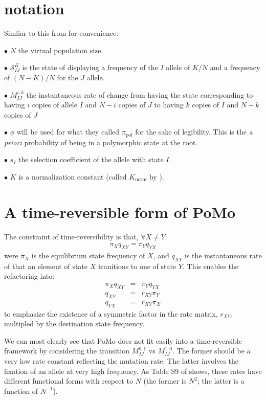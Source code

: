 \documentclass{llncs}
\newcommand{\virtPopSize}{\ensuremath{N}}
\newcommand{\polyProb}{\ensuremath{\phi}}
\newcommand{\pomoState}[3]{\ensuremath{\mathcal{S}_{#1#2}^{#3}}}
\newcommand{\Knorm}{\ensuremath{K}}
\newcommand{\pomo}{PoMo\xspace}
\begin{document}
\section{notation}
Simliar to this from  \cite{DeMaioSK2013} for convenience:
\begin{compactitem}
\item[$\bullet$] $\virtPopSize$ the virtual population size.
\item[$\bullet$] $\pomoState{I}{J}{K}$ is the state of displaying a frequency of the $I$ allele of $K/\virtPopSize$ and a frequency of $(N-K)/N$ for the $J$ allele.
\item[$\bullet$] $M_{IJ}^{i,k}$ the instantaneous rate of change from having the state corresponding to having $i$ copies of allele $I$ and $N-i$ copies of $J$ to having $k$ copies of $I$ and $N-k$ copies of $J$
\item[$\bullet$] $\polyProb$ will be used for what they called $\pi_{\mbox{pol}}$ for the sake of 
    legibility. This is the {\em a priori} probability of being in a polymorphic state at the root.
\item[$\bullet$] $s_I$ the selection coefficient of the allele with state $I$.
\item[$\bullet$] $\Knorm$ is a normalization constant (called $K_{\mbox{norm}}$ by \cite{DeMaioSK2013}).
\end{compactitem}

\section{A time-reversible form of \pomo}
The constraint of time-reversibility is that, $\forall X \neq Y$:
\begin{eqnarray}
    \pi_X q_{XY} = \pi_Y q_{YX}
\end{eqnarray}
were $\pi_X$ is the equilibrium state frequency of $X$, and $q_{XY}$ is the instantaneous
    rate of that an element of state $X$ tranitions to one of state $Y$.
This enables the refactoring into:
\begin{eqnarray}
    \pi_X q_{XY} & = & \pi_Y q_{YX} \\
    q_{XY} & = & r_{XY}\pi_Y \\
    q_{YX} & = & r_{XY}\pi_X
\end{eqnarray}
to emphasize the existence of a symmetric factor in the rate matrix, $r_{XY}$, multipled by the destination state frequency.

We can most clearly see that \pomo does not fit easily into a time-reversible framework by considering 
    the transition $M_{IJ}^{0,1}$ vs $M_{IJ}^{1,0}$. 
The former should be a very low rate constant reflecting the mutation rate.
The latter involves the fixation of an allele at very high frequency.
As Table S9 of  \cite{DeMaioSK2013} shows, these rates have different functional forms with respect to $N$ (the former is $N^2$; the latter is a function of $N^{-1}$).
\end{document}
